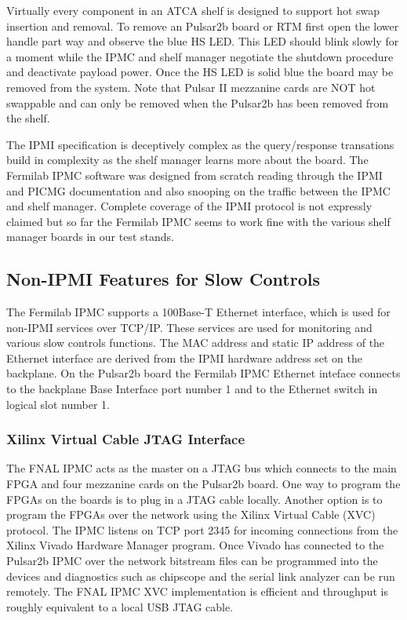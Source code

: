 \documentclass[letterpaper]{article}
\begin{document}
Virtually every component in an ATCA shelf is designed to support hot swap insertion and removal.  To remove an Pulsar2b board or RTM first open the lower handle part way and observe the blue HS LED.  This LED should blink slowly for a moment while the IPMC and shelf manager negotiate the shutdown procedure and deactivate payload power.  Once the HS LED is solid blue the board may be removed from the system.  Note that Pulsar II mezzanine cards are NOT hot swappable and can only be removed when the Pulsar2b has been removed from the shelf.

The IPMI specification is deceptively complex as the query/response transations build in complexity as the shelf manager learns more about the board.  The Fermilab IPMC software was designed from scratch reading through the IPMI and PICMG documentation and also snooping on the traffic between the IPMC and shelf manager.  Complete coverage of the IPMI protocol is not expressly claimed but so far the Fermilab IPMC seems to work fine with the various shelf manager boards in our test stands.

\subsection{Non-IPMI Features for Slow Controls}

The Fermilab IPMC supports a 100Base-T Ethernet interface, which is used for non-IPMI services over TCP/IP.  These services are used for monitoring and various slow controls functions.  The MAC address and static IP address of the Ethernet interface are derived from the IPMI hardware address set on the backplane.  On the Pulsar2b board the Fermilab IPMC Ethernet inteface connects to the backplane Base Interface port number 1 and to the Ethernet switch in logical slot number 1.

\subsubsection{Xilinx Virtual Cable JTAG Interface}

The FNAL IPMC acts as the master on a JTAG bus which connects to the main FPGA and four mezzanine cards on the Pulsar2b board.  One way to program the FPGAs on the boards is to plug in a JTAG cable locally.  Another option is to program the FPGAs over the network using the Xilinx Virtual Cable (XVC) protocol.  The IPMC listens on TCP port 2345 for incoming connections from the Xilinx Vivado Hardware Manager program.  Once Vivado has connected to the Pulsar2b IPMC over the network bitstream files can be programmed into the devices and diagnostics such as chipscope and the serial link analyzer can be run remotely.  The FNAL IPMC XVC implementation is efficient and throughput is roughly equivalent to a local USB JTAG cable.
\end{document}
